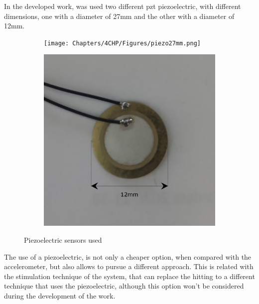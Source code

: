 In the developed work, was used two different \acrshort{pzt} piezoelectric, with different dimensions, one with a diameter of 27mm and the other with a diameter of 12mm.

\begin{figure}[]
    \centering
    \begin{subfigure}{0.45\textwidth}
        \centering
        \texttt{[image: Chapters/4CHP/Figures/piezo27mm.png]}
        \caption{}{}
        \label{subfig:piezo1}
    \end{subfigure}
    \begin{subfigure}{0.45\textwidth}
        \centering
        \includegraphics[width=\linewidth]{Chapters/4CHP/Figures/piezo12mm.png}
        \caption{}{}
        \label{subfig:piezo2}
    \end{subfigure}
    \caption{Piezoelectric sensors used}{}
    \label{fig:UsedPiezos}
\end{figure}
The use of a piezoelectric, is not only a cheaper option, when compared with the accelerometer, but also allows to pursue a different approach. This is related with the stimulation technique of the system, that can replace the hitting to a different technique that uses the piezoelectric, although this option won't be considered during the development of the work. 

